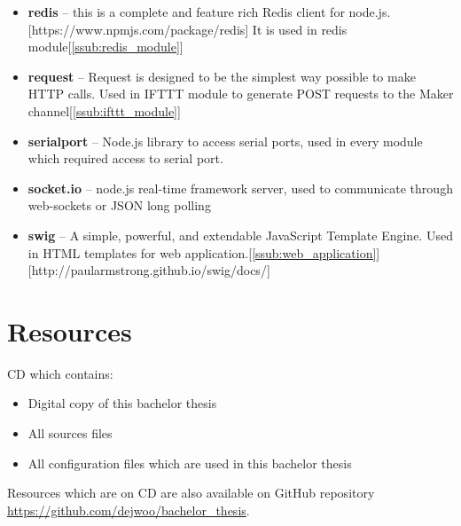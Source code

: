 \begin{itemize}
    \item \textbf{redis} -- this is a complete and feature rich Redis client for node.js.[https://www.npmjs.com/package/redis] It is used in redis module[\ref{ssub:redis_module}]
    \item \textbf{request} -- Request is designed to be the simplest way possible to make HTTP calls. Used in IFTTT module to generate POST requests to the Maker channel[\ref{ssub:ifttt_module}]
    \item \textbf{serialport} -- Node.js library to access serial ports, used in every module which required access to serial port.
    \item \textbf{socket.io} -- node.js real-time framework server, used to communicate through web-sockets or JSON long polling
    \item \textbf{swig} -- A simple, powerful, and extendable JavaScript Template Engine. Used in HTML templates for web application.[\ref{ssub:web_application}][http://paularmstrong.github.io/swig/docs/]
\end{itemize}


\chapter{Resources} %
\label{sec:resources}
CD which contains:
\begin{itemize}
\item Digital copy of this bachelor thesis
\item All sources files
\item All configuration files which are used in this bachelor thesis
\end{itemize}
Resources which are on CD are also available on GitHub repository \url{https://github.com/dejwoo/bachelor_thesis}.